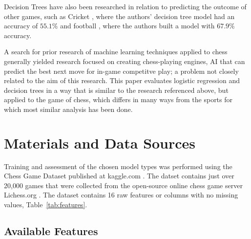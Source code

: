 \documentclass[12pt]{article}
\begin{document}
Decision Trees have also been researched in relation to predicting the outcome of other games, such as Cricket \cite{Kumar2018}, where the authors' decision tree model had an accuracy of $55.1\%$ and football \cite{Jaeyalakshmi2023}, where the authors built a model with $67.9\%$ accuracy.

A search for prior research of machine learning techniques applied to chess generally yielded research focused on creating chess-playing engines, AI that can predict the best next move for in-game competitve play; a problem not closely related to the aim of this research. This paper evaluates logistic regression and decision trees in a way that is similar to the research referenced above, but applied to the game of chess, which differs in many ways from the sports for which most similar analysis has been done.

\section{Materials and Data Sources}
\label{sec:dataset}

Training and assessment of the chosen model types was performed using the Chess Game Dataset published at kaggle.com \cite{chessDataset}. The datset contains just over 20,000 games that were collected from the open-source online chess game server Lichess.org \cite{lichessOrg}. The dataset contains 16 raw features or columns with no missing values, Table~\ref{tab:features}.

\subsection{Available Features}
\label{sec:features}
\end{document}
